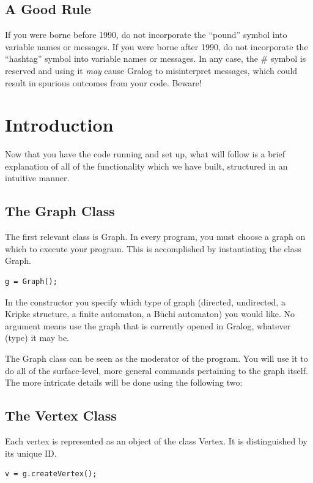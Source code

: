\documentclass{article}
\newlength\q
\begin{document}
\subsection{A Good Rule}
If you were borne before 1990, do not incorporate the "`pound"' symbol into variable names or messages. If you were borne after 1990, do not incorporate the "`hashtag"' symbol into variable names or messages. In any case, the \# symbol is reserved and using it \textit{may} cause Gralog to misinterpret messages, which could result in spurious outcomes from your code. Beware!

\section{Introduction}
Now that you have the code running and set up, what will follow is a brief explanation of all of the functionality which we have built, structured in an intuitive manner.

\subsection{The Graph Class}
The first relevant class is Graph. In every program, you must choose a graph on which to execute your program. This is accomplished by instantiating the class Graph. 

\begin{lstlisting}
g = Graph();
\end{lstlisting}

In the constructor you specify which type of graph (directed,
undirected, a Kripke structure, a finite automaton, a Büchi automaton) you would like. No
argument means use the graph that is currently opened in Gralog, whatever (type) it may be.

The Graph class can be seen as the moderator of the program. You will use it to do all of the surface-level, more general commands pertaining to the graph itself. The more intricate details will be done using the following two:

\subsection{The Vertex Class}
Each vertex is represented as an object of the class Vertex. It is distinguished by its unique ID. 

\begin{lstlisting}
v = g.createVertex();
\end{lstlisting}
\end{document}

